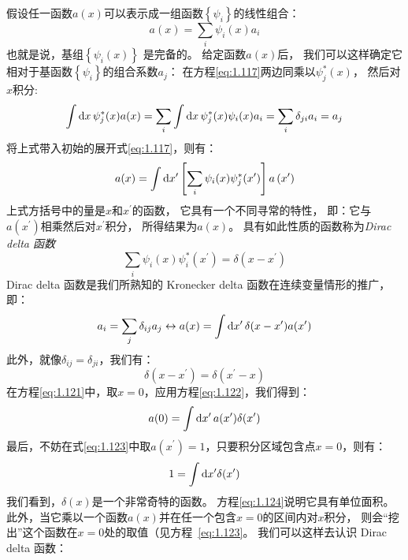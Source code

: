假设任一函数$a(x)$可以表示成一组函数$\left\{\psi_i\right\}$的线性组合：
\begin{equation}
 a(x) = \sum_i \psi_i(x)a_i
 \label{eq:1.117}
\end{equation}
也就是说，基组$\left\{\psi_i(x)\right\}$ 是完备的。
给定函数$a(x)$后，
我们可以这样确定它相对于基函数$\left\{\psi_i\right\}$的组合系数$a_j$：
在方程\eqref{eq:1.117}两边同乘以$\psi_j^\ast(x)$，
然后对$x$积分:
\begin{equation}
 \int \mathrm{d}x\,\psi_j^\ast(x)a(x) = \sum_i \int \mathrm{d}x\,\psi_j^\ast(x)\psi_i(x)a_i = \sum_i \delta_{ji}a_i = a_j
 \label{eq:1.118}
\end{equation}
将上式带入初始的展开式\eqref{eq:1.117}，则有：
\begin{equation}
 a(x) = \int \mathrm{d}x^\prime\left[\sum_i\psi_i(x)\psi_j^\ast(x^\prime)\right]a\left(x^\prime\right)
 \label{eq:1.119}
\end{equation}
上式方括号中的量是$x$和$x^\prime$的函数，
它具有一个不同寻常的特性，
即：它与$a(x^\prime)$相乘然后对$x^\prime$积分，
所得结果为$a(x)$。
具有如此性质的函数称为\emph{Dirac delta 函数}
\begin{equation}
 \sum_i \psi_i(x)\psi_i^\ast(x^\prime) = \delta(x-x^\prime)
 \label{eq:1.120}
\end{equation}
Dirac delta 函数是我们所熟知的 Kronecker delta 函数在连续变量情形的推广，即：
\begin{equation}
 a_i = \sum_j\delta_{ij}a_j \leftrightarrow a(x) = \int\mathrm{d}x^\prime\,\delta(x-x^\prime)a(x^\prime)
 \label{eq:1.121}
\end{equation}
此外，就像$\delta_{ij} = \delta_{ji}$，我们有：
\begin{equation}
 \delta(x-x^\prime) = \delta(x^\prime -x)
 \label{eq:1.122}
\end{equation}
在方程\eqref{eq:1.121}中，取$x=0$，应用方程\eqref{eq:1.122}，我们得到：
\begin{equation}
 a(0) = \int \mathrm{d}x^\prime\,a(x^\prime)\delta(x^\prime)
 \label{eq:1.123}
\end{equation}
最后，不妨在式\eqref{eq:1.123}中取$a(x^\prime)=1$，只要积分区域包含点$x=0$，则有：
\begin{equation}
 1 = \int \mathrm{d}x^\prime \delta(x^\prime)
 \label{eq:1.124}
\end{equation}
我们看到，$\delta(x)$是一个非常奇特的函数。
方程\eqref{eq:1.124}说明它具有单位面积。
此外，当它乘以一个函数$a(x)$并在任一个包含$x=0$的区间内对$x$积分，
则会``挖出''这个函数在$x=0$处的取值（见方程~\ref{eq:1.123}。
我们可以这样去认识 Dirac delta 函数：
